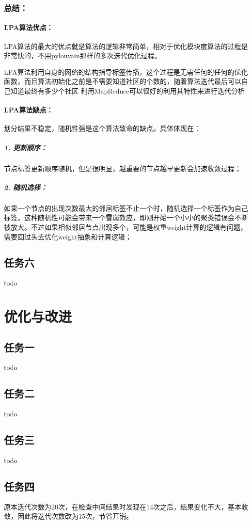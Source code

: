 \documentclass[a4paper,UTF8]{article}
\numberwithin{equation}{section}
\begin{document}
\subsubsection{总结：}
\paragraph{LPA算法优点：} 
\par LPA算法的最大的优点就是算法的逻辑非常简单，相对于优化模块度算法的过程是非常快的，不用pylouvain那样的多次迭代优化过程。
\par LPA算法利用自身的网络的结构指导标签传播，这个过程是无需任何的任何的优化函数，而且算法初始化之前是不需要知道社区的个数的，随着算法迭代最后可以自己知道最终有多少个社区
利用MapReduce可以很好的利用其特性来进行迭代分析
\paragraph{LPA算法缺点：}  
\par 划分结果不稳定，随机性强是这个算法致命的缺点。具体体现在：
\subparagraph{1. 更新顺序：}
节点标签更新顺序随机，但是很明显，越重要的节点越早更新会加速收敛过程；
\subparagraph{2. 随机选择：}
如果一个节点的出现次数最大的邻居标签不止一个时，随机选择一个标签作为自己标签。这种随机性可能会带来一个雪崩效应，即刚开始一个小小的聚类错误会不断被放大。不过如果相似邻居节点出现多个，可能是权重weight计算的逻辑有问题，需要回过头去优化weight抽象和计算逻辑；

\subsection{任务六}
todo

\section{优化与改进}
\subsection{任务一}
todo

\subsection{任务二}
todo

\subsection{任务三}
todo

\subsection{任务四}
原本迭代次数为20次，在检查中间结果时发现在14次之后，结果变化不大，基本收敛，因此将迭代次数改为15次，节省开销。
\end{document}
